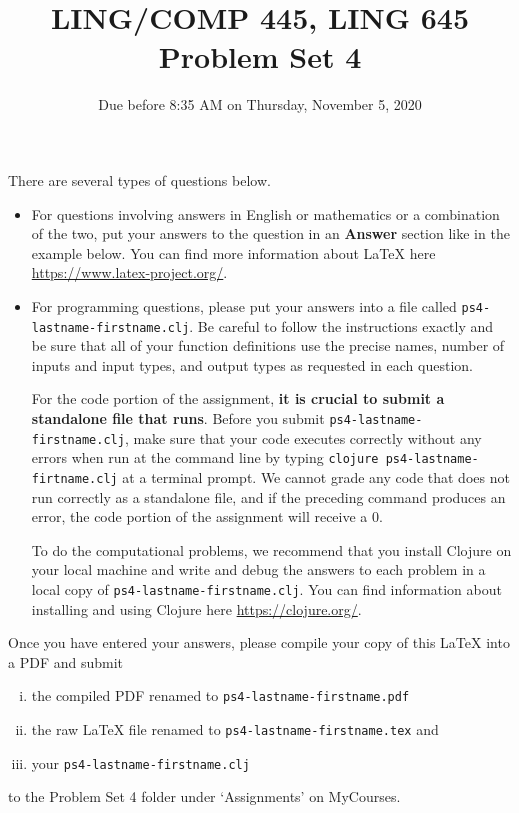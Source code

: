 \documentclass[10pt]{article}
\newcommand{\PSnum}{4}
\begin{document}
\title{LING/COMP 445, LING 645\\Problem Set \PSnum}
\date{Due before 8:35 AM on Thursday, November 5, 2020}
\maketitle
There are several types of questions below. 
\begin{itemize}
\item
For questions involving answers in English or mathematics or a
combination of the two, put your answers to the question in an
\textbf{Answer} section like in the example below. You can find more
information about \LaTeX{} here \url{https://www.latex-project.org/}.

\item For programming questions,
please put your answers into a file called
\texttt{ps\PSnum-lastname-firstname.clj}. Be careful to follow the instructions
exactly and be sure that all of your function definitions use the
precise names, number of inputs and input types, and output types as
requested in each question.

For the code portion of the assignment, \textbf{it is crucial to submit a
standalone file that runs}. Before you submit \texttt{ps\PSnum-lastname-firstname.clj}, 
make sure that your code executes correctly without any errors 
when run at the command line by typing 
\texttt{clojure ps\PSnum-lastname-firtname.clj} at a terminal
prompt. We cannot grade any code that does not run correctly as a
standalone file, and if the preceding command produces an error,
the code portion of the assignment will receive a $0$.

To do the computational problems, we recommend that you install
Clojure on your local machine and write and debug the answers to each
problem in a local copy of \texttt{ps\PSnum-lastname-firstname.clj}. You can
find information about installing and using Clojure here
\url{https://clojure.org/}.
\end{itemize}
Once you have entered your answers, please compile your copy of this
\LaTeX{} into a PDF and submit 
\begin{enumerate}[(i),noitemsep]
\item
the compiled PDF renamed to
\texttt{ps\PSnum-lastname-firstname.pdf} 
\item
the raw \LaTeX{} file renamed to
\texttt{ps\PSnum-lastname-firstname.tex} and 
\item
your \texttt{ps\PSnum-lastname-firstname.clj}
\end{enumerate}
to the Problem Set \PSnum{} folder under `Assignments' on MyCourses.
\end{document}
